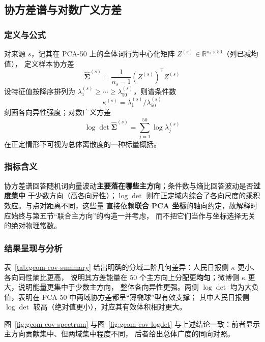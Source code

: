 \documentclass[withoutpreface]{cumcmthesis}
\begin{document}
\subsection{协方差谱与对数广义方差}

\subsubsection{定义与公式}
对来源 $s$，记其在 PCA-50 上的全体词行为中心化矩阵 $Z^{(s)}\in\mathbb{R}^{n_s\times 50}$（列已减均值），
定义样本协方差
\begin{equation}
  \hat{\boldsymbol{\Sigma}}^{(s)}=\frac{1}{n_s-1}(Z^{(s)})^{\mathsf{T}}Z^{(s)}
\end{equation}
设特征值按降序排列为 $\lambda^{(s)}_1\ge\cdots\ge\lambda^{(s)}_{50}$，则谱条件数
\begin{equation}
  \kappa^{(s)}=\lambda^{(s)}_1/\lambda^{(s)}_{50}
\end{equation}
刻画各向异性强度；对数广义方差
\begin{equation}
  \log\det\hat{\boldsymbol{\Sigma}}^{(s)}=\sum_{j=1}^{50}\log\lambda^{(s)}_j
\end{equation}
在正定情形下可视为总体离散度的一种标量概括。

\subsubsection{指标含义}
协方差谱回答随机词向量波动\textbf{主要落在哪些主方向}；条件数与熵比回答波动是否\textbf{过度集中}
于少数方向（高各向异性）；$\log\det$ 则在正定域内综合了各向尺度的乘积效应。与点对距离不同，这些量
直接依赖\textbf{联合 PCA 坐标}的轴向约定，故解释时应始终与第五节“联合主方向”的构造一并考虑，
而不把它们当作与坐标选择无关的绝对物理常数。

\subsubsection{结果呈现与分析}
表~\ref{tab:geom-cov-summary} 给出明确的分域二阶几何差异：人民日报侧 $\kappa$ 更小、各向同性熵比更高，
说明其方差能量在 $50$ 个主方向上分配更\textbf{均匀}；微博侧 $\kappa$ 更大，说明能量更集中于少数主方向，
整体各向异性更强。两侧 $\log\det$ 均为大负值，表明在 PCA-50 中两域协方差都呈“薄椭球”型有效支撑；
其中人民日报侧 $\log\det$ 较高（绝对值更小），对应其有效体积相对更大。

图~\ref{fig:geom-cov-spectrum} 与图~\ref{fig:geom-cov-logdet} 与上述结论一致：前者显示主方向贡献集中、但两域集中程度不同，
后者给出总体广度的同向对照。
\end{document}
